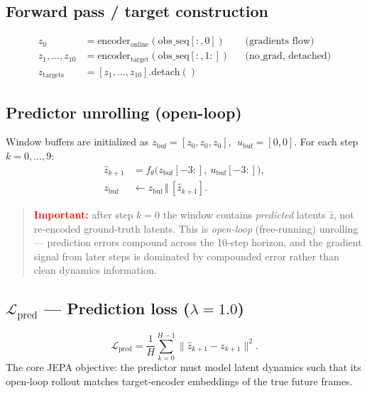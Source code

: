 \documentclass[11pt]{article}
\newcommand{\loss}[1]{\mathcal{L}_{\text{#1}}}
\begin{document}
\subsection{Forward pass / target construction}

\begin{align}
z_0 &= \text{encoder}_{\text{online}}(\text{obs\_seq}[:,0]) && \text{(gradients flow)} \\
z_{1}, \ldots, z_{10} &= \text{encoder}_{\text{target}}(\text{obs\_seq}[:,1{:}]) && \text{(no\_grad, detached)} \\
z_{\text{targets}} &= [z_1, \ldots, z_{10}].\text{detach}()
\end{align}

\subsection{Predictor unrolling (open-loop)}

Window buffers are initialized as
$z_{\text{buf}} = [z_0, z_0, z_0]$, $\;u_{\text{buf}} = [0, 0]$.
For each step $k = 0, \ldots, 9$:
\begin{align}
\hat z_{k+1} &= f_\theta\big( z_{\text{buf}}[-3{:}],\ u_{\text{buf}}[-3{:}] \big), \\
z_{\text{buf}} &\leftarrow z_{\text{buf}} \,\Vert\, [\hat z_{k+1}].
\end{align}

\begin{quote}
\textcolor{red}{\textbf{Important:}} after step $k=0$ the window contains
\emph{predicted} latents $\hat z$, not re-encoded ground-truth latents. This is
\emph{open-loop} (free-running) unrolling --- prediction errors compound across
the 10-step horizon, and the gradient signal from later steps is dominated by
compounded error rather than clean dynamics information.
\end{quote}

\subsection{$\loss{pred}$ --- Prediction loss \quad ($\lambda = 1.0$)}
\begin{equation}
\loss{pred} = \frac{1}{H} \sum_{k=0}^{H-1} \big\| \hat z_{k+1} - z_{k+1} \big\|^2 .
\end{equation}
The core JEPA objective: the predictor must model latent dynamics such that
its open-loop rollout matches target-encoder embeddings of the true future
frames.
\end{document}
